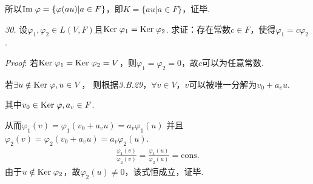所以$\mathrm{Im \;} \varphi=\{\varphi (au)|a \in F\}$，即$K=\{au|a \in F\}$，证毕.

\hspace*{\fill}

\textit{30.}
设$\varphi_1,\varphi_2 \in L(V,F)$且$\mathrm{Ker \;}  \varphi_1=\mathrm{Ker \;}  \varphi_2$.
求证：存在常数$c \in F$，使得$\varphi_1=c \varphi_2$.

\textit{Proof}:
若$\mathrm{Ker \;} \varphi_1=\mathrm{Ker \;} \varphi_2=V$，则$\varphi_1=\varphi_2=0$，故$c$可以为任意常数.

若$\exists u \notin \mathrm{Ker \;} \varphi,u \in V$，
则根据\textit{3.B.29}，$\forall v \in V$，$v$可以被唯一分解为$v_0+a_vu$.

其中$v_0 \in \mathrm{Ker \;} \varphi,a_v \in F$.

从而$\varphi_1(v)=\varphi_1(v_0+a_vu)=a_v \varphi_1(u)$
并且$\varphi_2(v)=\varphi_2(v_0+a_vu)=a_v \varphi_2(u)$.
    \begin{align*}
        \frac{\varphi_1(v)}{\varphi_2(v)}=\frac{\varphi_1(u)}{\varphi_2(u)}=\mathrm{cons.}
    \end{align*}
由于$u \notin \mathrm{Ker \;} \varphi_2$，故$\varphi_2(u) \ne 0$，该式恒成立，证毕.

